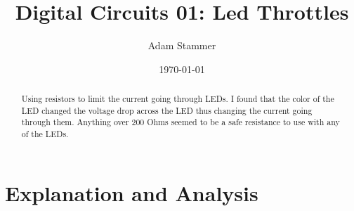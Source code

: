 \documentclass[prb,preprint]{revtex4-1}
\begin{document}
\title{Digital Circuits 01: Led Throttles}
\author{Adam Stammer}

\date{\today}

\begin{abstract}
Using resistors to limit the current going through LEDs. I found that the color of the LED changed the voltage drop across the LED thus changing the current going through them. Anything over 200 Ohms seemed to be a safe resistance to use with any of the LEDs.
\end{abstract}

\maketitle


%
%
%
%
%
%
%
%

\section{Explanation and Analysis}
\end{document}

